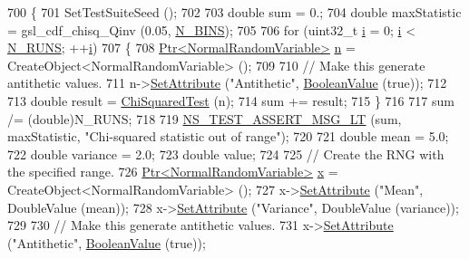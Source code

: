 \begin{DoxyCode}
700 \{
701   SetTestSuiteSeed ();
702 
703   \textcolor{keywordtype}{double} sum = 0.;
704   \textcolor{keywordtype}{double} maxStatistic = gsl\_cdf\_chisq\_Qinv (0.05, \hyperlink{classRandomVariableStreamNormalAntitheticTestCase_a8e535b2fdb6a3f59c0abc6b61998a657}{N\_BINS});
705 
706   \textcolor{keywordflow}{for} (uint32\_t \hyperlink{bernuolliDistribution_8m_a6f6ccfcf58b31cb6412107d9d5281426}{i} = 0; \hyperlink{bernuolliDistribution_8m_a6f6ccfcf58b31cb6412107d9d5281426}{i} < \hyperlink{classRandomVariableStreamNormalAntitheticTestCase_aad75ff2556c09a7dfb5e08546b25fac4}{N\_RUNS}; ++\hyperlink{bernuolliDistribution_8m_a6f6ccfcf58b31cb6412107d9d5281426}{i})
707     \{
708       \hyperlink{classns3_1_1Ptr}{Ptr<NormalRandomVariable>} \hyperlink{namespacesample-rng-plot_aeb5ee5c431e338ef39b7ac5431242e1d}{n} = CreateObject<NormalRandomVariable> ();
709 
710       \textcolor{comment}{// Make this generate antithetic values.}
711       n->\hyperlink{classns3_1_1ObjectBase_ac60245d3ea4123bbc9b1d391f1f6592f}{SetAttribute} (\textcolor{stringliteral}{"Antithetic"}, \hyperlink{classns3_1_1BooleanValue}{BooleanValue} (\textcolor{keyword}{true}));
712 
713       \textcolor{keywordtype}{double} result = \hyperlink{classRandomVariableStreamNormalAntitheticTestCase_a685f62e02fc09e39ff03e6bf82b1bad3}{ChiSquaredTest} (n);
714       sum += result;
715     \}
716 
717   sum /= (double)N\_RUNS;
718 
719   \hyperlink{group__testing_ga1d96848b91407c9a0b36583e8b0ad7ae}{NS\_TEST\_ASSERT\_MSG\_LT} (sum, maxStatistic, \textcolor{stringliteral}{"Chi-squared statistic out of range"});
720 
721   \textcolor{keywordtype}{double} mean = 5.0;
722   \textcolor{keywordtype}{double} variance = 2.0;
723   \textcolor{keywordtype}{double} value;
724 
725   \textcolor{comment}{// Create the RNG with the specified range.}
726   \hyperlink{classns3_1_1Ptr}{Ptr<NormalRandomVariable>} \hyperlink{lte__link__budget__x2__handover__measures_8m_a9336ebf25087d91c818ee6e9ec29f8c1}{x} = CreateObject<NormalRandomVariable> ();
727   x->\hyperlink{classns3_1_1ObjectBase_ac60245d3ea4123bbc9b1d391f1f6592f}{SetAttribute} (\textcolor{stringliteral}{"Mean"}, DoubleValue (mean));
728   x->\hyperlink{classns3_1_1ObjectBase_ac60245d3ea4123bbc9b1d391f1f6592f}{SetAttribute} (\textcolor{stringliteral}{"Variance"}, DoubleValue (variance));
729 
730   \textcolor{comment}{// Make this generate antithetic values.}
731   x->\hyperlink{classns3_1_1ObjectBase_ac60245d3ea4123bbc9b1d391f1f6592f}{SetAttribute} (\textcolor{stringliteral}{"Antithetic"}, \hyperlink{classns3_1_1BooleanValue}{BooleanValue} (\textcolor{keyword}{true}));

\end{DoxyCode}
